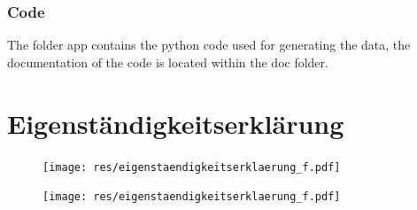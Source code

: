 \documentclass[12pt,a4paper, english,twoside]{scrartcl}
\begin{document}
  \subsubsection{Code}\label{sec:code}
      The folder app contains the python code used for generating the data, the documentation of the code is located within the doc folder.
\newpage
\printbibliography%
\newpage
{}
\section*{Eigenständigkeitserklärung}\label{sec:eigenstaendigkeit}
\begin{figure}[!b]
    \texttt{[image: res/eigenstaendigkeitserklaerung\_f.pdf]}
\end{figure}
\newpage
\begin{figure}[!b]
    \texttt{[image: res/eigenstaendigkeitserklaerung\_f.pdf]}
\end{figure}
%
\restoregeometry%
\end{document}
